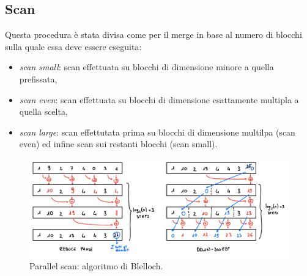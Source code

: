 \documentclass[]{IEEEtran}
\begin{document}
	
	\subsection{Scan}
	\label{scan}
	Questa procedura è stata divisa come per il merge in base al numero di blocchi sulla quale essa deve essere eseguita:
	\begin{itemize}
		\item \textit{scan small}: scan effettuata su blocchi di dimensione minore a quella prefissata,
		\item \textit{scan even}: scan effettuata su blocchi di dimensione esattamente multipla a quella scelta,
		\item \textit{scan large}: scan effettutata prima su blocchi di dimensione multilpa (scan even) ed infine scan sui restanti blocchi (scan small).
	\end{itemize}
	\begin{figure}[H]
		\includegraphics[scale=0.3]{scan.png}
		\caption{Parallel scan: algoritmo di Blelloch.}
	\end{figure}
	
\end{document}
